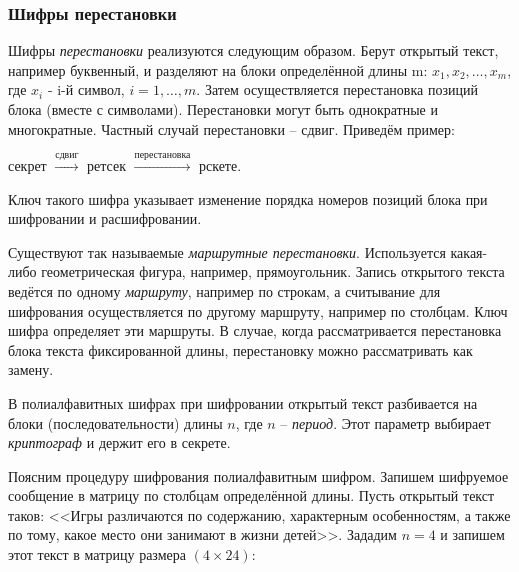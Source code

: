 \subsubsection{Шифры перестановки}

Шифры \emph{перестановки} реализуются следующим образом. Берут открытый текст, например буквенный, и разделяют на блоки определённой длины m: $x_1, x_2, \dots, x_m$, где $x_i$ - i-й символ, $i = 1, \dots , m$. Затем осуществляется перестановка позиций блока (вместе с символами). Перестановки могут быть однократные и многократные. Частный случай перестановки -- сдвиг. Приведём пример:
\begin{center}
    секрет $\xrightarrow{\text{сдвиг}}$ ретсек $\xrightarrow{\text{перестановка}}$ рскете.
\end{center}
Ключ такого шифра указывает изменение порядка номеров позиций блока при шифровании и расшифровании.

Существуют так называемые \emph{маршрутные перестановки}. Используется какая-либо геометрическая фигура, например, прямоугольник. Запись открытого текста ведётся по одному \emph{маршруту}, например по строкам, а считывание для шифрования осуществляется по другому маршруту, например по столбцам. Ключ шифра определяет эти маршруты.
В случае, когда рассматривается перестановка блока текста фиксированной длины, перестановку можно рассматривать как замену.

В полиалфавитных шифрах при шифровании открытый текст разбивается на блоки (последовательности) длины $n$, где $n$ -- \emph{период}. Этот параметр выбирает \emph{криптограф} и держит его в секрете.

Поясним процедуру шифрования полиалфавитным шифром. Запишем шифруемое сообщение в матрицу по столбцам определённой длины. Пусть открытый текст таков: <<Игры различаются по содержанию, характерным особенностям, а также по тому, какое место они занимают в жизни детей>>. Зададим $n=4$ и запишем этот текст в матрицу размера $(4 \times 24)$:

\begin{center}  \end{center}

